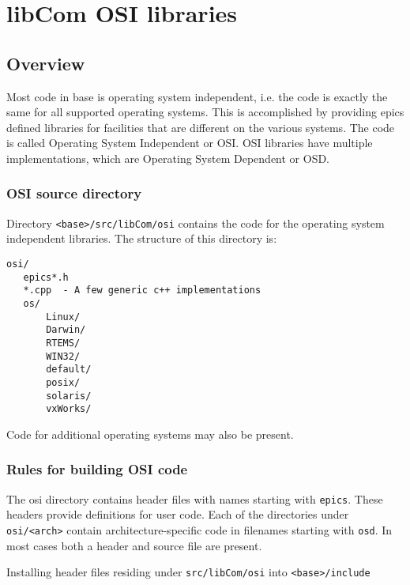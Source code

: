 \chapter{libCom OSI libraries}

\section{Overview}

Most code in base is operating system independent, i.e. the code is exactly the same for all supported operating systems. 
This is accomplished by providing epics defined libraries for facilities that are different on the various systems. The code 
is called Operating System Independent or OSI. OSI libraries have multiple implementations, which are Operating 
System Dependent or OSD.

\subsection{OSI source directory}

Directory \verb|<base>/src/libCom/osi| contains the code for the operating system independent libraries. The structure 
of this directory is:

\begin{verbatim}
osi/
   epics*.h
   *.cpp  - A few generic c++ implementations
   os/
       Linux/
       Darwin/
       RTEMS/
       WIN32/
       default/
       posix/
       solaris/
       vxWorks/
\end{verbatim}

Code for additional operating systems may also be present.

\subsection{Rules for building OSI code}

The osi directory contains header files with names starting with \verb|epics|. These headers provide definitions for user code. 
Each of the directories under \verb|osi/<arch>| contain architecture-specific code in filenames starting with \verb|osd|. In most 
cases both a header and source file are present.

Installing header files residing under \verb|src/libCom/osi| into \verb|<base>/include|

